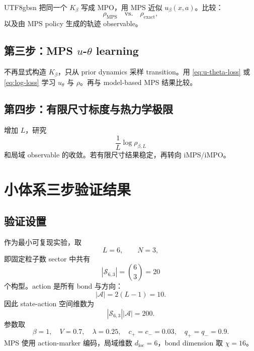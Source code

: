 \documentclass[11pt]{article}
\begin{document}
\begin{CJK*}{UTF8}{gbsn}
把同一个 \(K_\beta\) 写成 MPO，用 MPS 近似 \(u_\beta(x,a)\)。比较：
\begin{equation}
    \rho_{\mathrm{MPS}}
    \quad
    \text{vs.}
    \quad
    \rho_{\mathrm{exact}},
\end{equation}
以及由 MPS policy 生成的轨迹 observable。

\subsection{\texorpdfstring{第三步：MPS \(u\)-\(\theta\) learning}{第三步：MPS u-theta learning}}

不再显式构造 \(K_\beta\)，只从 prior dynamics 采样 transition。用 \eqref{eq:u-theta-loss}
或 \eqref{eq:log-loss} 学习 \(u_\theta\) 与 \(\rho\)。再与 model-based MPS 结果比较。

\subsection{第四步：有限尺寸标度与热力学极限}

增加 \(L\)，研究
\begin{equation}
    \frac{1}{L}\log\rho_{\beta,L}
\end{equation}
和局域 observable 的收敛。若有限尺寸结果稳定，再转向 iMPS/iMPO。

\section{小体系三步验证结果}

\subsection{验证设置}

作为最小可复现实验，取
\begin{equation}
    L=6,\qquad N=3,
\end{equation}
即固定粒子数 sector 中共有
\begin{equation}
    |\mathcal S_{6,3}|=\binom{6}{3}=20
\end{equation}
个构型。action 是所有 bond 与方向：
\begin{equation}
    |\mathcal A|=2(L-1)=10.
\end{equation}
因此 state-action 空间维数为
\begin{equation}
    |\mathcal S_{6,3}||\mathcal A|=200.
\end{equation}
参数取
\begin{equation}
    \beta=1,\quad
    V=0.7,\quad
    \lambda=0.25,\quad
    c_+=c_-=0.03,\quad
    q_+=q_-=0.9.
\end{equation}
MPS 使用 action-marker 编码，局域维数 \(d_{\mathrm{loc}}=6\)，bond dimension 取 \(\chi=16\)。


\end{CJK*}
\end{document}
